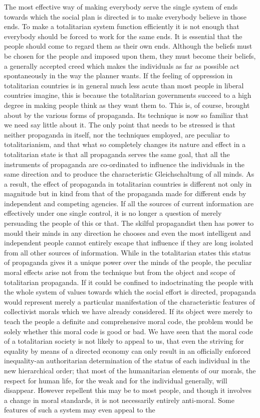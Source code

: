 \documentclass[11pt,openany]{book}
\begin{document}
The most effective way of making everybody serve the single system of ends towards which the social plan is directed is to make everybody believe in those ends. To make a totalitarian system function efficiently it is not enough that everybody should be forced to work for the same ends. It is essential that the people should come to regard them as their own ends. Although the beliefs must be chosen for the people and imposed upon them, they must become their beliefs, a generally accepted creed which makes the individuals as far as possible act spontaneously in the way the planner wants. If the feeling of oppression in totalitarian countries is in general much less acute than most people in liberal countries imagine, this is because the totalitarian governments succeed to a high degree in making people think as they want them to. This is, of course, brought about by the various forms of propaganda. Its technique is now so familiar that we need say little about it. The only point that needs to be stressed is that neither propaganda in itself, nor the techniques employed, are peculiar to totalitarianism, and that what so completely changes its nature and effect in a totalitarian state is that all propaganda serves the same goal, that all the instruments of propaganda are co-ordinated to influence the individuals in the same direction and to produce the characteristic Gleichschaltung of all minds. As a result, the effect of propaganda in totalitarian countries is different not only in magnitude but in kind from that of the propaganda made for different ends by independent and competing agencies. If all the sources of current information are effectively under one single control, it is no longer a question of merely persuading the people of this or that. The skilful propagandist then has power to mould their minds in any direction he chooses and even the most intelligent and independent people cannot entirely escape that influence if they are long isolated from all other sources of information. While in the totalitarian states this status of propaganda gives it a unique power over the minds of the people, the peculiar moral effects arise not from the technique but from the object and scope of totalitarian propaganda. If it could be confined to indoctrinating the people with the whole system of values towards which the social effort is directed, propaganda would represent merely a particular manifestation of the characteristic features of collectivist morals which we have already considered. If its object were merely to teach the people a definite and comprehensive moral code, the problem would be solely whether this moral code is good or bad. We have seen that the moral code of a totalitarian society is not likely to appeal to us, that even the striving for equality by means of a directed economy can only result in an officially enforced inequality-an authoritarian determination of the status of each individual in the new hierarchical order; that most of the humanitarian elements of our morals, the respect for human life, for the weak and for the individual generally, will disappear. However repellent this may be to most people, and though it involves a change in moral standards, it is not necessarily entirely anti-moral. Some features of such a system may even appeal to the 
\end{document}
